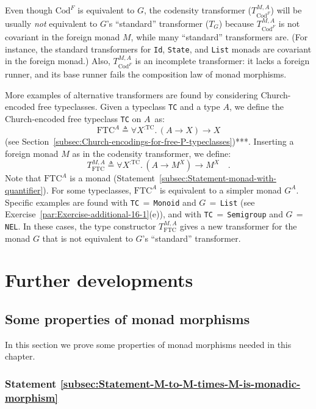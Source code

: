 Even though $\text{Cod}^{F}$ is equivalent to $G$, the codensity
transformer ($T_{\text{Cod}^{F}}^{M,A}$) will be usually \emph{not}
equivalent to $G$\textsf{'}s \textsf{``}standard\textsf{''} transformer ($T_{G}$) because
$T_{\text{Cod}^{F}}^{M,A}$ is not covariant in the foreign monad
$M$, while many \textsf{``}standard\textsf{''} transformers are. (For instance, the
standard transformers for \lstinline!Id!, \lstinline!State!, and
\lstinline!List! monads are covariant in the foreign monad.) Also,
$T_{\text{Cod}^{F}}^{M,A}$ is an incomplete transformer: it lacks
a foreign runner, and its base runner fails the composition law of
monad morphisms.

More examples of alternative transformers are found by considering
Church-encoded free typeclasses. Given a typeclass \lstinline!TC!
and a type $A$, we define the Church-encoded free typeclass \lstinline!TC!
on $A$~as:
\[
\text{FTC}^{A}\triangleq\forall X^{:\text{TC}}.\,(A\rightarrow X)\rightarrow X
\]
(see Section~\ref{subsec:Church-encodings-for-free-P-typeclasses}){*}{*}{*}.
Inserting a foreign monad $M$ as in the codensity transformer, we
define:
\[
T_{\text{FTC}}^{M,A}\triangleq\forall X^{:\text{TC}}.\,(A\rightarrow M^{X})\rightarrow M^{X}\quad.
\]
Note that $\text{FTC}^{A}$ is a monad (Statement~\ref{subsec:Statement-monad-with-quantifier}).
For some typeclasses, $\text{FTC}^{A}$ is equivalent to a simpler
monad $G^{A}$. Specific examples are found with \lstinline!TC!$\,=\,$\lstinline!Monoid!
and $G$$\,=\,$\lstinline!List! (see Exercise~\ref{par:Exercise-additional-16-1}(e)),
and with \lstinline!TC!$\,=\,$\lstinline!Semigroup! and $G$$\,=\,$\lstinline!NEL!.
In these cases,  the type constructor $T_{\text{FTC}}^{M,A}$ gives
a new transformer for the monad $G$ that is not equivalent to $G$\textsf{'}s
\textsf{``}standard\textsf{''} transformer.

\section{Further developments}

\subsection{Some properties of monad morphisms}

In this section we prove some properties of monad morphisms needed
in this chapter.

\subsubsection{Statement \label{subsec:Statement-M-to-M-times-M-is-monadic-morphism}\ref{subsec:Statement-M-to-M-times-M-is-monadic-morphism}}

